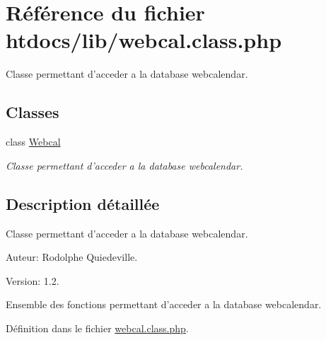 \hypertarget{webcal_8class_8php}{
\section{R\'{e}f\'{e}rence du fichier htdocs/lib/webcal.class.php}
\label{webcal_8class_8php}
}
Classe permettant d'acceder a la database webcalendar.  


\subsection*{Classes}
\begin{CompactItemize}
\item 
class \hyperlink{classWebcal}{Webcal}
\begin{CompactList}\small\item\em Classe permettant d'acceder a la database webcalendar. \item\end{CompactList}\end{CompactItemize}


\subsection{Description d\'{e}taill\'{e}e}
Classe permettant d'acceder a la database webcalendar. 

\begin{Desc}
\item[Auteur:]Rodolphe Quiedeville. \end{Desc}
\begin{Desc}
\item[Version:]1.2.\end{Desc}
Ensemble des fonctions permettant d'acceder a la database webcalendar.

D\'{e}finition dans le fichier \hyperlink{webcal_8class_8php-source}{webcal.class.php}.